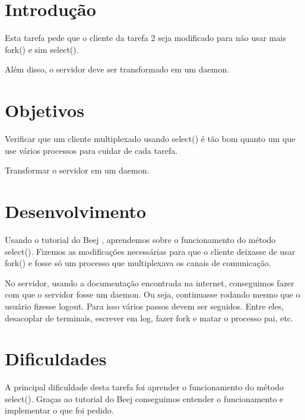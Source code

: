 \documentclass[12pt,a4paper]{article}
\begin{document}


\tableofcontents

\section{Introdução}

Esta tarefa pede que o cliente da tarefa 2 seja modificado para não usar mais fork() e sim select(). 

Além disso, o servidor deve ser transformado em um daemon.

\section{Objetivos}

Verificar que um cliente multiplexado usando select() é tão bom quanto um que use vários processos para cuidar de cada tarefa.

Transformar o servidor em um daemon.

\section{Desenvolvimento}

Usando o tutorial do Beej \cite{beej}, aprendemos sobre o funcionamento do método select(). Fizemos as modificações necessárias para que o cliente deixasse de usar fork() e fosse só um processo que multiplexava os canais de comunicação.

No servidor, usando a documentação encontrada na internet, conseguimos fazer com que o servidor fosse um daemon. Ou seja, continuasse rodando mesmo que o usuário fizesse logout. Para isso vários passos devem ser seguidos. Entre eles, desacoplar de terminais, escrever em log, fazer fork e matar o processo pai, etc. 

\section{Dificuldades}

A principal dificuldade desta tarefa foi aprender o funcionamento do método select(). Graças ao tutorial do Beej \cite{beej} conseguimos entender o funcionamento e implementar o que foi pedido.
\end{document}
